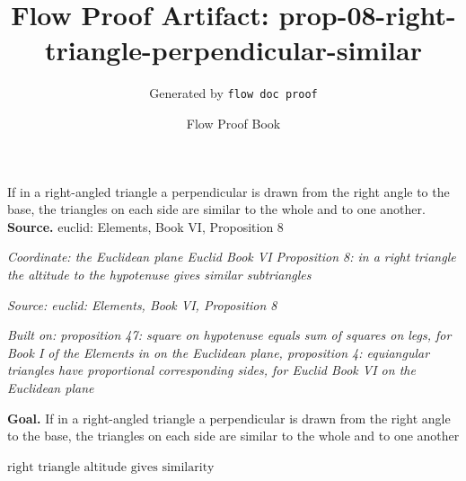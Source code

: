 \documentclass[11pt]{article}
\title{Flow Proof Artifact: prop-08-right-triangle-perpendicular-similar}
\author{Generated by \texttt{flow doc proof}}
\date{Flow Proof Book}
\theoremstyle{definition}
\begin{document}
\maketitle
If in a right-angled triangle a perpendicular is drawn from the right angle to the base, the triangles on each side are similar to the whole and to one another.\\[0.5em]
\textbf{Source.} euclid: Elements, Book VI, Proposition 8\\[0.5em]
\bigskip
{}\par
\smallskip\noindent\textit{Coordinate: the Euclidean plane \cdot Euclid Book VI \cdot Proposition 8: in a right triangle the altitude to the hypotenuse gives similar subtriangles}\par
\smallskip\noindent\textit{Source: euclid: Elements, Book VI, Proposition 8}\par
\smallskip\noindent\textit{Built on: proposition 47: square on hypotenuse equals sum of squares on legs, for Book I of the Elements in on the Euclidean plane, proposition 4: equiangular triangles have proportional corresponding sides, for Euclid Book VI on the Euclidean plane}\par
\medskip
\noindent\textbf{Goal.} If in a right-angled triangle a perpendicular is drawn from the right angle to the base, the triangles on each side are similar to the whole and to one another\par
\noindent$\displaystyle \text{right triangle altitude gives similarity}$\par
\medskip
\noindent
\end{document}
